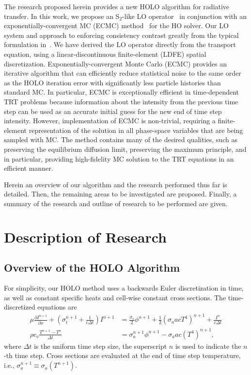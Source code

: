 \documentclass[11pt]{article}
\newcommand{\pderiv}[2]{\frac{\partial #1}{\partial #2}}
\begin{document}
The research proposed herein provides a new HOLO algorithm for radiative transfer.
In this work, we propose an S$_2$-like LO operator~\cite{wolters}
in conjunction with an exponentially-convergent MC (ECMC) method~\cite{jake} for the
HO solver. Our LO system and approach to enforcing consistency contrast greatly from the typical formulation
in~\cite{rmc,willert,park}. We have derived the LO operator directly from the transport
equation, using a linear-discontinuous finite-element (LDFE) spatial
discretization.   
Exponentially-convergent Monte Carlo (ECMC)\cite{jake,ans_2014} provides an iterative algorithm that can efficiently
reduce statistical noise to the same order as the HOLO iteration error with
significantly less particle histories than standard MC. In particular, ECMC is
exceptionally efficient in time-dependent TRT problems because information about the
intensity from the previous time step can be used as an accurate initial guess for
the new end of time step intensity.   However, implementation
of ECMC is non-trivial, requiring a finite-element representation of the solution in
all phase-space variables that are being sampled with MC.  
The method contains many of the desired qualities, such as
preserving the equilibrium diffusion limit, preserving the maximum principle, and in
particular, providing high-fidelity MC solution to the TRT equations in an efficient
manner.

Herein an overview of our algorithm and the research performed thus far is
detailed.  Then, the remaining areas to be investigated are proposed.  Finally, a
summary of the research and outline of research to be performed are given.



\section{Description of Research}

\subsection{Overview of the HOLO Algorithm}

For simplicity, our HOLO method uses a backwards Euler discretization in time, as
well as constant specific heats and cell-wise constant cross sections. The time-discretized
equations are
\begin{align}
    \mu \pderiv{I^{n+1}}{x} + \left(\sigma_t^{n+1} + \frac{1}{c \Delta t }\right) I^{n+1}
&= \frac{\sigma_s}{2} \phi^{n+1} +\frac{1}{2} \left(\sigma_a a c T^4 \right)^{n+1} + \frac{I^n}{c \Delta t} \label{ho_trans} \\
\rho c_v \frac{T^{n+1} - T^n}{\Delta t} &= \sigma_a^{n+1} \phi^{n+1}
- \sigma_a a c (T^4)^{n+1} \label{lo_mat},
\end{align}
where $\Delta t$ is the uniform time step size, the superscript $n$ is used to indicate
the $n$-th time step. Cross sections are evaluated at the end of time step
temperature, i.e., $\sigma_a^{n+1}\equiv\sigma_a(T^{n+1})$.   
\end{document}

